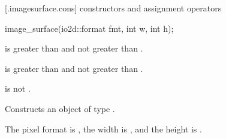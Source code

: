  [\iotwod.imagesurface.cons] { constructors and assignment operators}

%
\begin{itemdecl}
image_surface(io2d::format fmt, int w, int h);
\end{itemdecl}
\begin{itemdescr}
\pnum
\requires
{} is greater than  and not greater than .

\pnum
{} is greater than  and not greater than .

\pnum
{} is not .

\pnum
\effects
Constructs an object of type .

\pnum
The pixel format is , the width is , and the height is .
\end{itemdescr}

